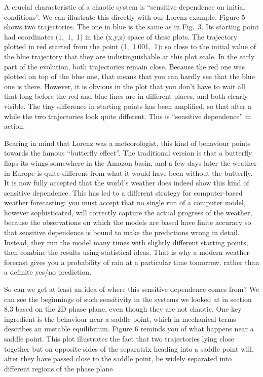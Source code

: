   A crucial characteristic of a chaotic system is “sensitive dependence on 
  initial conditions”. We can illustrate this directly with our Lorenz example. 
  Figure 5 shows two trajectories. The one in blue is the same as in Fig.\ 3. 
  Its starting point had coordinates (1,~1,~1) in the (x,y,z) space of these 
  plots. The trajectory plotted in red started from the point (1,~1.001,~1): so 
  close to the initial value of the blue trajectory that they are 
  indistinguishable at this plot scale. In the early part of the evolution, 
  both trajectories remain close. Because the red one was plotted on top of the 
  blue one, that means that you can hardly see that the blue one is there. 
  However, it is obvious in the plot that you don't have to wait all that long 
  before the red and blue lines are in different places, and both clearly 
  visible. The tiny difference in starting points has been amplified, so that 
  after a while the two trajectories look quite different. This is ``sensitive 
  dependence'' in action. 


  Bearing in mind that Lorenz was a meteorologist, this kind of behaviour 
  points towards the famous ``butterfly effect''. The traditional version is 
  that a butterfly flaps its wings somewhere in the Amazon basin, and a few 
  days later the weather in Europe is quite different from what it would have 
  been without the butterfly. It is now fully accepted that the world's weather 
  does indeed show this kind of sensitive dependence. This has led to a 
  different strategy for computer-based weather forecasting: you must accept 
  that no single run of a computer model, however sophisticated, will correctly 
  capture the actual progress of the weather, because the observations on which 
  the models are based have finite accuracy so that sensitive dependence is 
  bound to make the predictions wrong in detail. Instead, they run the model 
  many times with slightly different starting points, then combine the results 
  using statistical ideas. That is why a modern weather forecast gives you a 
  probability of rain at a particular time tomorrow, rather than a definite 
  yes/no prediction. 

  So can we get at least an idea of where this sensitive dependence comes from? 
  We can see the beginnings of such sensitivity in the systems we looked at in 
  section 8.3 based on the 2D phase plane, even though they are not chaotic. 
  One key ingredient is the behaviour near a saddle point, which in mechanical 
  terms describes an unstable equilibrium. Figure 6 reminds you of what happens 
  near a saddle point. This plot illustrates the fact that two trajectories 
  lying close together but on opposite sides of the separatrix heading into a 
  saddle point will, after they have passed close to the saddle point, be 
  widely separated into different regions of the phase plane. 

